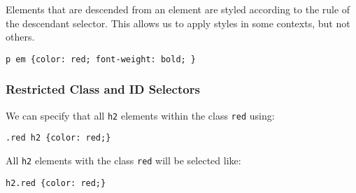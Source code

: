 Elements that are descended from an element are styled according to the rule of the descendant selector.
This allows us to apply styles in some contexts, but not others.
\begin{verbatim}
p em {color: red; font-weight: bold; }
\end{verbatim}

\subsubsection{Restricted Class and ID Selectors}\label{ssub:restricted_class_and_id_selectors}

We can specify that all \texttt{h2} elements within the class \texttt{red} using:
\begin{verbatim}
.red h2 {color: red;}
\end{verbatim}
All \texttt{h2} elements with the class \texttt{red} will be selected like:
\begin{verbatim}
h2.red {color: red;}
\end{verbatim}
